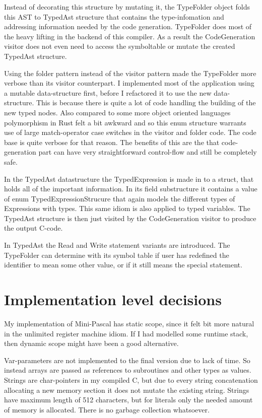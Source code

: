 \documentclass[12pt,a4paper]{article}
\begin{document}
Instead of decorating this structure by mutating it, the TypeFolder object
folds this AST to TypedAst structure that contains the type-infomation and
addressing information needed by the code generation. TypeFolder does most of
the heavy lifting in the backend of this compiler.  As a result the
CodeGeneration visitor does not even need to access the symboltable or mutate
the created TypedAst structure.

Using the folder pattern instead of the visitor pattern made the TypeFolder
more verbose than its visitor counterpart. I implemented most of the
application using a mutable data-structure first, before I refactored it to use
the new data-structure. This is because there is quite a lot of code handling
the building of the new typed nodes. Also compared to some more object oriented
languages polymorphism in Rust felt a bit awkward and so this enum structure
warrants use of large match-operator case switches in the visitor and folder
code. The code base is quite verbose for that reason. The benefits of this are
the that code-generation part can have very straightforward control-flow and
still be completely safe.

In the TypedAst datastructure the TypedExpression is made in to a struct,
that holds all of the important information. In its field
substructure it contains a value of enum TypedExpressionStrucure that
again models the different types of Expressions with types.
This same idiom is also applied to typed variables. The TypedAst structure is
then just visited by the CodeGeneration visitor to produce the output
C-code.

In TypedAst the Read and Write statement variants are introduced.
The TypeFolder can determine with its symbol table if user
has redefined the identifier to mean some other value, or
if it still means the special statement.

\section{Implementation level decisions}

My implementation of Mini-Pascal has static scope, since it felt bit more
natural in the unlimited register machine idiom.  If I had  modelled some
runtime stack, then dynamic scope might have been a good alternative.

Var-parameters are not implemented to the final version due to lack of time.
So instead arrays are passed as references to subroutines and other types as
values. Strings are char-pointers in my compiled C, but due to every string
concatenation allocating a new memory section it does not mutate the existing
string.  Strings have maximum length of 512 characters, but for literals only
the needed amount of memory is allocated. There is no garbage collection
whatsoever.
\end{document}
